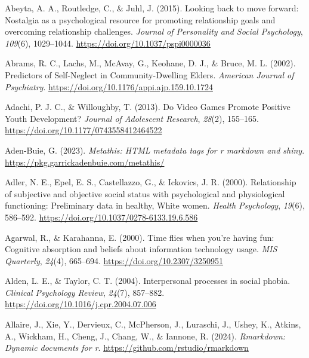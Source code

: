 \documentclass[
]{udthesis}
\newlength{\cslhangindent}
\newenvironment{CSLReferences}[2] %
 {\begin{list}{}{%
  \setlength{\itemindent}{0pt}
  \setlength{\leftmargin}{0pt}
  \setlength{\parsep}{0pt}
  \ifodd #1
   \setlength{\leftmargin}{\cslhangindent}
   \setlength{\itemindent}{-1\cslhangindent}
  \fi
  \setlength{\itemsep}{#2\baselineskip}}}
 {\end{list}}
\begin{document}
\label{refs}
\begin{CSLReferences}{1}{0}
Abeyta, A. A., Routledge, C., \& Juhl, J. (2015). Looking back to move forward: {Nostalgia} as a psychological resource for promoting relationship goals and overcoming relationship challenges. \emph{Journal of Personality and Social Psychology}, \emph{109}(6), 1029--1044. \url{https://doi.org/10.1037/pspi0000036}

Abrams, R. C., Lachs, M., McAvay, G., Keohane, D. J., \& Bruce, M. L. (2002). Predictors of {Self}-{Neglect} in {Community}-{Dwelling Elders}. \emph{American Journal of Psychiatry}. \url{https://doi.org/10.1176/appi.ajp.159.10.1724}

Adachi, P. J. C., \& Willoughby, T. (2013). Do {Video Games Promote Positive Youth Development}? \emph{Journal of Adolescent Research}, \emph{28}(2), 155--165. \url{https://doi.org/10.1177/0743558412464522}

Aden-Buie, G. (2023). \emph{Metathis: HTML metadata tags for r markdown and shiny}. \url{https://pkg.garrickadenbuie.com/metathis/}

Adler, N. E., Epel, E. S., Castellazzo, G., \& Ickovics, J. R. (2000). Relationship of subjective and objective social status with psychological and physiological functioning: {Preliminary} data in healthy, {White} women. \emph{Health Psychology}, \emph{19}(6), 586--592. \url{https://doi.org/10.1037/0278-6133.19.6.586}

Agarwal, R., \& Karahanna, E. (2000). Time flies when you're having fun: Cognitive absorption and beliefs about information technology usage. \emph{MIS Quarterly}, \emph{24}(4), 665--694. \url{https://doi.org/10.2307/3250951}

Alden, L. E., \& Taylor, C. T. (2004). Interpersonal processes in social phobia. \emph{Clinical Psychology Review}, \emph{24}(7), 857--882. \url{https://doi.org/10.1016/j.cpr.2004.07.006}

Allaire, J., Xie, Y., Dervieux, C., McPherson, J., Luraschi, J., Ushey, K., Atkins, A., Wickham, H., Cheng, J., Chang, W., \& Iannone, R. (2024). \emph{Rmarkdown: Dynamic documents for r}. \url{https://github.com/rstudio/rmarkdown}


\end{CSLReferences}
\end{document}
